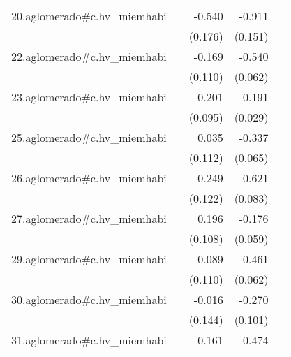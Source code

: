 {\begin{longtable}{l*{4}{D{.}{.}{-1}}}
\addlinespace
20.aglomerado#c.hv\_miemhabi&                     &      -0.540\sym{**} &      -0.911\sym{***}&                     \\
            &                     &     (0.176)         &     (0.151)         &                     \\
\addlinespace
22.aglomerado#c.hv\_miemhabi&                     &      -0.169         &      -0.540\sym{***}&                     \\
            &                     &     (0.110)         &     (0.062)         &                     \\
\addlinespace
23.aglomerado#c.hv\_miemhabi&                     &       0.201\sym{*}  &      -0.191\sym{***}&                     \\
            &                     &     (0.095)         &     (0.029)         &                     \\
\addlinespace
25.aglomerado#c.hv\_miemhabi&                     &       0.035         &      -0.337\sym{***}&                     \\
            &                     &     (0.112)         &     (0.065)         &                     \\
\addlinespace
26.aglomerado#c.hv\_miemhabi&                     &      -0.249\sym{*}  &      -0.621\sym{***}&                     \\
            &                     &     (0.122)         &     (0.083)         &                     \\
\addlinespace
27.aglomerado#c.hv\_miemhabi&                     &       0.196         &      -0.176\sym{**} &                     \\
            &                     &     (0.108)         &     (0.059)         &                     \\
\addlinespace
29.aglomerado#c.hv\_miemhabi&                     &      -0.089         &      -0.461\sym{***}&                     \\
            &                     &     (0.110)         &     (0.062)         &                     \\
\addlinespace
30.aglomerado#c.hv\_miemhabi&                     &      -0.016         &      -0.270\sym{**} &                     \\
            &                     &     (0.144)         &     (0.101)         &                     \\
\addlinespace
31.aglomerado#c.hv\_miemhabi&                     &      -0.161         &      -0.474\sym{***}&                     \\

\end{longtable}}
